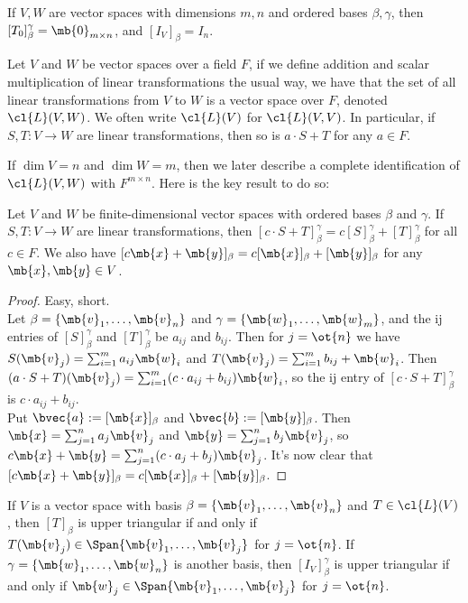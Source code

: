 If $V,W$ are vector spaces with dimensions $m,n$ and ordered bases $\beta, \gamma$, then $[T_0]_\beta^\gamma= \mb{0}_{m \times n}$, and $[I_V]_\beta=I_n$.
\begin{defn}
Let $V$ and $W$ be vector spaces over a field $F$, if we define addition and scalar multiplication of linear transformations the usual way, we have that the set of all linear transformations from $V$ to $W$ is a vector space over $F$, denoted $\cl{L}(V,W)$. We often write $\cl{L}(V)$ for $\cl{L}(V,V)$.
In particular, if $S,T:V \to W$ are linear transformations, then so is $a \cdot S+T$ for any $a \in F$.
\end{defn}
If $\dim V=n$ and $\dim W=m$, then we later describe a complete identification of $\cl{L}(V,W)$ with $F^{m \times n}$. Here is the key result to do so:
\begin{lem}\label{l:mat-represent-linear}
Let $V$ and $W$ be finite-dimensional vector spaces with ordered bases $\beta$ and $\gamma$. If $S,T:V \to W$ are linear transformations, then $[c \cdot S+T]_\beta^\gamma =c[S]_\beta^\gamma +[T]_\beta^\gamma$ for all $c \in F$.
We also have $[c \mb{x}+ \mb{y}]_\beta =c[ \mb{x}]_\beta +[ \mb{y}]_\beta$ for any $\mb{x}, \mb{y}\in V$.
\end{lem}
\begin{proof}
Easy, short.\\
Let $\beta= \{ \mb{v}_1, \ldots, \mb{v}_n \}$ and $\gamma= \{ \mb{w}_1, \ldots, \mb{w}_m \}$, and the ij entries of $[S]_\beta^\gamma$ and $[T]_\beta^\gamma$ be $a_{ij}$ and $b_{ij}$.
Then for $j=\ot{n}$ we have $S( \mb{v}_j)= \sum_{i=1}^ma_{ij}\mb{w}_i$ and $T( \mb{v}_j)= \sum_{i=1}^mb_{ij}+ \mb{w}_i$. Then $(a \cdot S+T)( \mb{v}_j)= \sum_{i=1}^m(c \cdot a_{ij}+b_{ij}) \mb{w}_i$, so the ij entry of $[c \cdot S+T]_\beta^\gamma$ is $c \cdot a_{ij}+b_{ij}$.\\
Put $\bvec{a}:=[ \mb{x}]_\beta$ and $\bvec{b}:=[ \mb{y}]_\beta$. Then $\mb{x}= \sum_{j=1}^na_j \mb{v}_j$ and $\mb{y}= \sum_{j=1}^nb_j \mb{v}_j$, so $c \mb{x}+ \mb{y}= \sum_{j=1}^n(c \cdot a_j+b_j) \mb{v}_j$. It's now clear that $[c \mb{x}+ \mb{y}]_\beta =c[ \mb{x}]_\beta +[ \mb{y}]_\beta$.
\end{proof}
\begin{exer}\label{e:ut-repr}
If $V$ is a vector space with basis $\beta= \{ \mb{v}_1, \ldots, \mb{v}_n \}$ and $T \in \cl{L}(V)$, then $[T]_\beta$ is upper triangular if and only if $T( \mb{v}_j) \in \Span \{ \mb{v}_1, \ldots, \mb{v}_j \}$ for $j=\ot{n}$.
If $\gamma= \{ \mb{w}_1, \ldots, \mb{w}_n \}$ is another basis, then $[I_V]_\beta^\gamma$ is upper triangular if and only if $\mb{w}_j \in \Span \{ \mb{v}_1, \ldots, \mb{v}_j \}$ for $j=\ot{n}$.
\end{exer}

